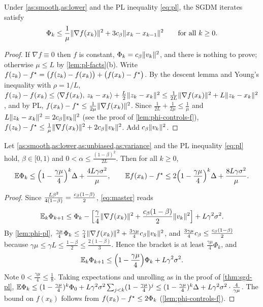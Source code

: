 \begin{lemma}\label{lem:phi-pl}
Under \cref{as:smooth,as:lower} and the PL inequality \eqref{eq:pl}, the SGDM iterates satisfy
\[
  \Phi_k\le\frac1\mu\lVert \nabla f(x_k)\rVert^2+3c_\beta\lVert x_k-x_{k-1}\rVert^2\qquad\text{for all }k\ge0.
\]
\end{lemma}

\begin{proof}
If $\nabla f\equiv0$ then $f$ is constant, $\Phi_k=c_\beta\lVert v_k\rVert^2$, and there is nothing to
prove; otherwise $\mu\le L$ by \cref{lem:pl-facts}(b). Write
$f(z_k)-f^\star=\bigl(f(z_k)-f(x_k)\bigr)+\bigl(f(x_k)-f^\star\bigr)$. By the descent lemma and Young's
inequality with $\rho=1/L$,
$f(z_k)-f(x_k)\le\langle \nabla f(x_k),\, z_k-x_k\rangle+\frac L2\lVert z_k-x_k\rVert^2
\le\frac1{2L}\lVert \nabla f(x_k)\rVert^2+L\lVert z_k-x_k\rVert^2$, and by PL,
$f(x_k)-f^\star\le\frac1{2\mu}\lVert \nabla f(x_k)\rVert^2$. Since $\frac1{2L}+\frac1{2\mu}\le\frac1\mu$
and $L\lVert z_k-x_k\rVert^2=2c_\beta\lVert v_k\rVert^2$ (see the proof of \cref{lem:phi-controls-f}),
$f(z_k)-f^\star\le\frac1\mu\lVert \nabla f(x_k)\rVert^2+2c_\beta\lVert v_k\rVert^2$. Add $c_\beta\lVert v_k\rVert^2$.
\end{proof}

\begin{tcolorbox}[keybox]
\begin{theorem}\label{thm:pl}
Let \cref{as:smooth,as:lower,as:unbiased,as:variance} and the PL inequality \eqref{eq:pl}
hold, $\beta\in[0,1)$ and $0<\alpha\le\frac{(1-\beta)^2}{2L}$. Then for all $k\ge0$,
\[
  \mathbb{E}\Phi_k\le\Bigl(1-\frac{\gamma\mu}{4}\Bigr)^k\Delta+\frac{4L\gamma\sigma^2}{\mu},
  \qquad
  \mathbb{E} f(x_k)-f^\star\le2\Bigl(1-\frac{\gamma\mu}{4}\Bigr)^k\Delta+\frac{8L\gamma\sigma^2}{\mu}.
\]
\end{theorem}
\end{tcolorbox}

\begin{proof}
Since $\frac{L\beta^2}{4(1-\beta)}=\frac{c_\beta(1-\beta)}{2}$, \eqref{eq:master} reads
\[
  \mathbb{E}_k\Phi_{k+1}\le\Phi_k-\Bigl[\frac\gamma4\lVert \nabla f(x_k)\rVert^2+\frac{c_\beta(1-\beta)}{2}\lVert v_k\rVert^2\Bigr]
  +L\gamma^2\sigma^2 .
\]
By \cref{lem:phi-pl}, $\frac{\gamma\mu}{4}\Phi_k\le\frac\gamma4\lVert \nabla f(x_k)\rVert^2+\frac{3\gamma\mu}{4}c_\beta\lVert v_k\rVert^2$,
and $\frac{3\gamma\mu}{4}c_\beta\le\frac{c_\beta(1-\beta)}{2}$ because
$\gamma\mu\le\gamma L\le\frac{1-\beta}{2}\le\frac{2(1-\beta)}{3}$. Hence the bracket is at
least $\frac{\gamma\mu}4\Phi_k$, and
\begin{equation}\label{eq:pl-contraction}
  \mathbb{E}_k\Phi_{k+1}\le\Bigl(1-\frac{\gamma\mu}4\Bigr)\Phi_k+L\gamma^2\sigma^2 .
\end{equation}
Note $0<\frac{\gamma\mu}{4}\le\frac18$. Taking expectations and unrolling as in the proof of
\cref{thm:sgd-pl},
$\mathbb{E}\Phi_k\le(1-\frac{\gamma\mu}4)^k\Phi_0+L\gamma^2\sigma^2\sum_{j<k}(1-\frac{\gamma\mu}4)^j
\le(1-\frac{\gamma\mu}4)^k\Delta+L\gamma^2\sigma^2\cdot\frac4{\gamma\mu}$. The bound on
$f(x_k)$ follows from $f(x_k)-f^\star\le2\Phi_k$ (\cref{lem:phi-controls-f}).
\end{proof}

